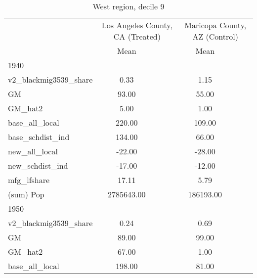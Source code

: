 \begin{table}[htbp]\centering
\def\sym#1{\ifmmode^{#1}\else\(^{#1}\)\fi}
\caption{West region, decile 9 \label{tab1}}
\begin{tabular}{l*{2}{ccc}}
\toprule
                    &\multicolumn{3}{c}{Los Angeles County, CA (Treated)}&\multicolumn{3}{c}{Maricopa County, AZ (Control)}\\
                    &        Mean&            &            &        Mean&            &            \\
\midrule
1940                &            &            &            &            &            &            \\
v2\_blackmig3539\_share&        0.33&            &            &        1.15&            &            \\
GM                  &       93.00&            &            &       55.00&            &            \\
GM\_hat2             &        5.00&            &            &        1.00&            &            \\
base\_all\_local      &      220.00&            &            &      109.00&            &            \\
base\_schdist\_ind    &      134.00&            &            &       66.00&            &            \\
new\_all\_local       &      -22.00&            &            &      -28.00&            &            \\
new\_schdist\_ind     &      -17.00&            &            &      -12.00&            &            \\
mfg\_lfshare         &       17.11&            &            &        5.79&            &            \\
(sum) Pop           &  2785643.00&            &            &   186193.00&            &            \\
\midrule
1950                &            &            &            &            &            &            \\
v2\_blackmig3539\_share&        0.24&            &            &        0.69&            &            \\
GM                  &       89.00&            &            &       99.00&            &            \\
GM\_hat2             &       67.00&            &            &        1.00&            &            \\
base\_all\_local      &      198.00&            &            &       81.00&            &            \\

\end{tabular}
\end{table}
